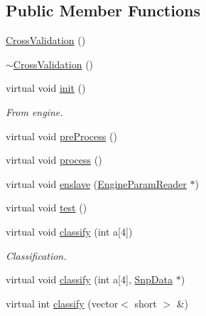 \subsection*{Public Member Functions}
\begin{DoxyCompactItemize}
\item 
\hyperlink{classCrossValidation_a855f538ef5541634f1dd94fbf965129b}{CrossValidation} ()
\item 
\hyperlink{classCrossValidation_a1e65ae700add864f2f85dcdf82940d74}{$\sim$CrossValidation} ()
\item 
virtual void \hyperlink{classCrossValidation_acf88bf85dec8d27f6aa97d9ec04ccf26}{init} ()
\begin{DoxyCompactList}\small\item\em From engine. \item\end{DoxyCompactList}\item 
virtual void \hyperlink{classCrossValidation_ad45dad478f034a39696660d7c93b34fa}{preProcess} ()
\item 
virtual void \hyperlink{classCrossValidation_a3435a227d91e03af7d1df7e2c6c4fce9}{process} ()
\item 
virtual void \hyperlink{classCrossValidation_a50b65a606c324404de92f44dba655154}{enslave} (\hyperlink{classEngineParamReader}{EngineParamReader} $\ast$)
\item 
virtual void \hyperlink{classCrossValidation_a1b4664d9123d676b778ff0e89379a1ba}{test} ()
\item 
virtual void \hyperlink{classCrossValidation_a6b26e9c496dac46fb066fae0f381fed0}{classify} (int a\mbox{[}4\mbox{]})
\begin{DoxyCompactList}\small\item\em Classification. \item\end{DoxyCompactList}\item 
virtual void \hyperlink{classCrossValidation_a237cd67d2e1e6fc7c62abf0fef8bd3e8}{classify} (int a\mbox{[}4\mbox{]}, \hyperlink{classSnpData}{SnpData} $\ast$)
\item 
virtual int \hyperlink{classCrossValidation_a4c11570314fe9e98e434abee990ac2d4}{classify} (vector$<$ short $>$ \&)
\end{DoxyCompactItemize}


